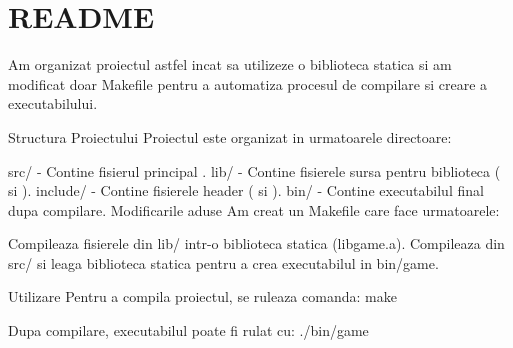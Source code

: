 \chapter{README}
\hypertarget{md__r_e_a_d_m_e}{}\label{md__r_e_a_d_m_e}
Am organizat proiectul astfel incat sa utilizeze o biblioteca statica si am modificat doar Makefile pentru a automatiza procesul de compilare si creare a executabilului.

Structura Proiectului Proiectul este organizat in urmatoarele directoare\+:

src/ -\/ Contine fisierul principal . lib/ -\/ Contine fisierele sursa pentru biblioteca ( si ). include/ -\/ Contine fisierele header ( si ). bin/ -\/ Contine executabilul final dupa compilare. Modificarile aduse Am creat un Makefile care face urmatoarele\+:

Compileaza fisierele din lib/ intr-\/o biblioteca statica (libgame.\+a). Compileaza  din src/ si leaga biblioteca statica pentru a crea executabilul in bin/game.

Utilizare Pentru a compila proiectul, se ruleaza comanda\+: make

Dupa compilare, executabilul poate fi rulat cu\+: ./bin/game 